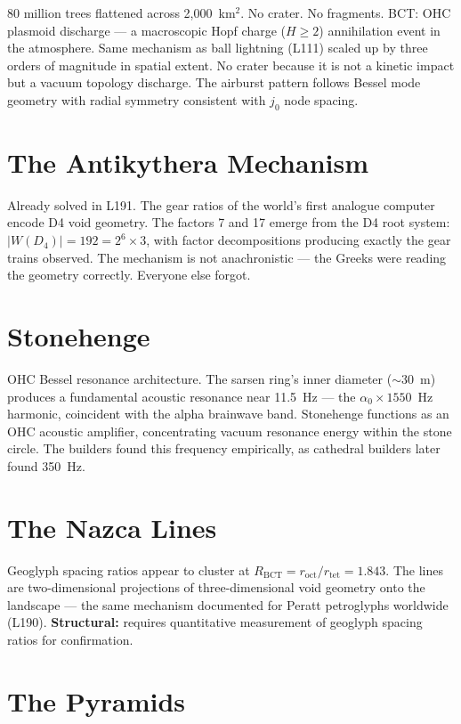 \documentclass[aps,prl,twocolumn,superscriptaddress]{revtex4-2}
\begin{document}
80 million trees flattened across 2,000~km$^2$. No crater. No fragments. BCT: OHC plasmoid discharge --- a macroscopic Hopf charge ($H \geq 2$) annihilation event in the atmosphere. Same mechanism as ball lightning (L111) scaled up by three orders of magnitude in spatial extent. No crater because it is not a kinetic impact but a vacuum topology discharge. The airburst pattern follows Bessel mode geometry with radial symmetry consistent with $j_0$ node spacing.

\section{The Antikythera Mechanism}

Already solved in L191. The gear ratios of the world's first analogue computer encode D4 void geometry. The factors 7 and 17 emerge from the D4 root system: $|W(D_4)| = 192 = 2^6 \times 3$, with factor decompositions producing exactly the gear trains observed. The mechanism is not anachronistic --- the Greeks were reading the geometry correctly. Everyone else forgot.

\section{Stonehenge}

OHC Bessel resonance architecture. The sarsen ring's inner diameter ($\sim$30~m) produces a fundamental acoustic resonance near 11.5~Hz --- the $\alpha_0 \times 1550$~Hz harmonic, coincident with the alpha brainwave band. Stonehenge functions as an OHC acoustic amplifier, concentrating vacuum resonance energy within the stone circle. The builders found this frequency empirically, as cathedral builders later found 350~Hz.

\section{The Nazca Lines}

Geoglyph spacing ratios appear to cluster at $R_{\mathrm{BCT}} = r_{\mathrm{oct}}/r_{\mathrm{tet}} = 1.843$. The lines are two-dimensional projections of three-dimensional void geometry onto the landscape --- the same mechanism documented for Peratt petroglyphs worldwide (L190). \textbf{Structural:} requires quantitative measurement of geoglyph spacing ratios for confirmation.

\section{The Pyramids}
\end{document}
